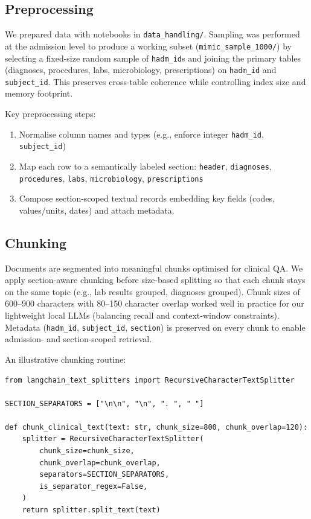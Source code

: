 \subsection{Preprocessing}
We prepared data with notebooks in \texttt{data\_handling/}. Sampling was performed at the admission level to produce a working subset (\texttt{mimic\_sample\_1000/}) by selecting a fixed-size random sample of \texttt{hadm\_id}s and joining the primary tables (diagnoses, procedures, labs, microbiology, prescriptions) on \texttt{hadm\_id} and \texttt{subject\_id}. This preserves cross-table coherence while controlling index size and memory footprint.

\noindent Key preprocessing steps:
\begin{enumerate}
  \item Normalise column names and types (e.g., enforce integer \texttt{hadm\_id}, \texttt{subject\_id})
  \item Map each row to a semantically labeled section: \texttt{header}, \texttt{diagnoses}, \texttt{procedures}, \texttt{labs}, \texttt{microbiology}, \texttt{prescriptions}
  \item Compose section-scoped textual records embedding key fields (codes, values/units, dates) and attach metadata.
\end{enumerate}

\subsection{Chunking}
Documents are segmented into meaningful chunks optimised for clinical QA. We apply section-aware chunking before size-based splitting so that each chunk stays on the same topic (e.g., lab results grouped, diagnoses grouped). Chunk sizes of 600--900 characters with 80--150 character overlap worked well in practice for our lightweight local LLMs (balancing recall and context-window constraints). Metadata (\texttt{hadm\_id}, \texttt{subject\_id}, \texttt{section}) is preserved on every chunk to enable admission- and section-scoped retrieval.

\smallskip
\noindent An illustrative chunking routine:
\begin{verbatim}
from langchain_text_splitters import RecursiveCharacterTextSplitter

SECTION_SEPARATORS = ["\n\n", "\n", ". ", " "]

def chunk_clinical_text(text: str, chunk_size=800, chunk_overlap=120):
    splitter = RecursiveCharacterTextSplitter(
        chunk_size=chunk_size,
        chunk_overlap=chunk_overlap,
        separators=SECTION_SEPARATORS,
        is_separator_regex=False,
    )
    return splitter.split_text(text)
\end{verbatim}

